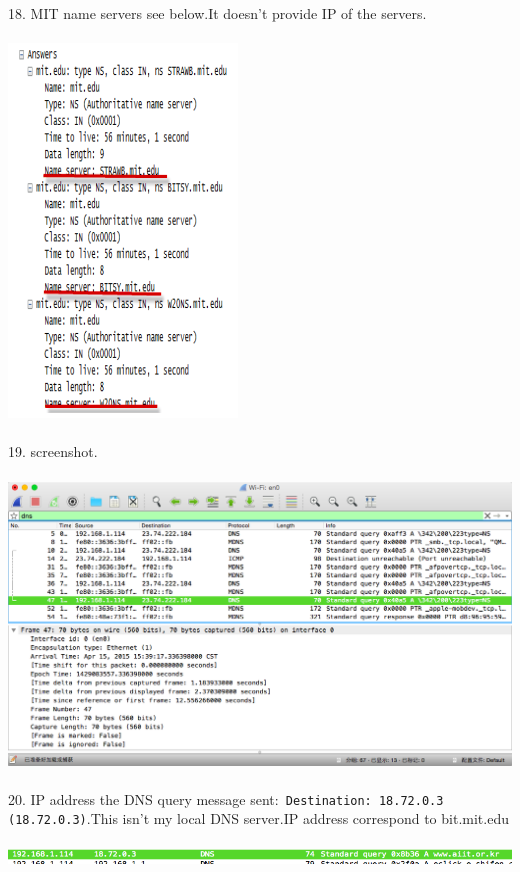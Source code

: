 \documentclass[a4paper]{article}
\begin{document}
{	18. MIT name servers see below.It doesn't provide IP of the servers.\\\\
	{\centering\includegraphics[scale=0.5]{Illustrations/18.png}}\\\\
	19. screenshot.\\\\
	{\centering\includegraphics[scale=0.4]{Illustrations/19.png}}\\\\
	20. IP address the DNS query message sent:\verb| Destination: 18.72.0.3 (18.72.0.3)|.This isn't my local DNS server.IP address correspond to bit.mit.edu \\\\
	{\centering\includegraphics[scale=0.5]{Illustrations/20.png}}\\\\
}
\end{document}
